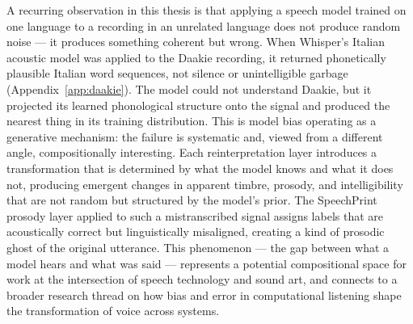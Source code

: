 A recurring observation in this thesis is that applying a speech model trained
on one language to a recording in an unrelated language does not produce random
noise --- it produces something coherent but wrong. When Whisper's Italian
acoustic model was applied to the Daakie recording, it returned phonetically
plausible Italian word sequences, not silence or unintelligible garbage
(Appendix~\ref{app:daakie}). The model could not understand Daakie, but it
projected its learned phonological structure onto the signal and produced the
nearest thing in its training distribution. This is model bias operating as a
generative mechanism: the failure is systematic and, viewed from a different
angle, compositionally interesting. Each reinterpretation layer introduces a
transformation that is determined by what the model knows and what it does not,
producing emergent changes in apparent timbre, prosody, and intelligibility that
are not random but structured by the model's prior. The SpeechPrint prosody
layer applied to such a mistranscribed signal assigns labels that are acoustically
correct but linguistically misaligned, creating a kind of prosodic ghost of the
original utterance. This phenomenon --- the gap between what a model hears and
what was said --- represents a potential compositional space for work at the
intersection of speech technology and sound art, and connects to a broader
research thread on how bias and error in computational listening shape the
transformation of voice across systems.


\newpage





